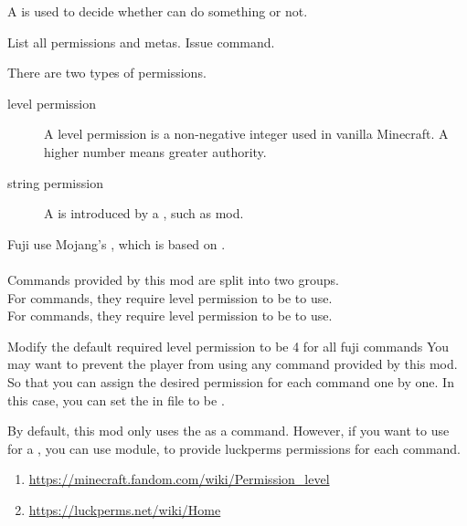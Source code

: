 \label{ch:permission}
A  is used to decide whether  can do something or not.

\begin{tips}{List all permissions and metas.}
    Issue  command.
\end{tips}



\begin{note}{There are two types of permissions.}
    \begin{description}
        \item[level permission]{A level permission is a non-negative integer used in vanilla Minecraft. A higher number means greater authority.}
        \item[string permission]{A  is introduced by a , such as  mod.}
    \end{description}
\end{note}

\clearpage
{}
Fuji use Mojang's , which is based on . \\\\
Commands provided by this mod are split into two groups. \\
For  commands, they require level permission to be  to use. \\
For  commands, they require level permission to be  to use. \\

\begin{tips}{Modify the default required level permission to be 4 for all fuji commands}
   You may want to prevent the player from using any command provided by this mod.
   So that you can assign the desired permission for each command one by one.
   In this case, you can set the  in \mainconfig file to be .
\end{tips}

By default, this mod only uses the  as  a command.
However, if you want to use  for a , you can use  module, to provide luckperms permissions for each command.



\begin{enumerate}
    \item \url{https://minecraft.fandom.com/wiki/Permission\_level}
    \item \url{https://luckperms.net/wiki/Home}
\end{enumerate}

